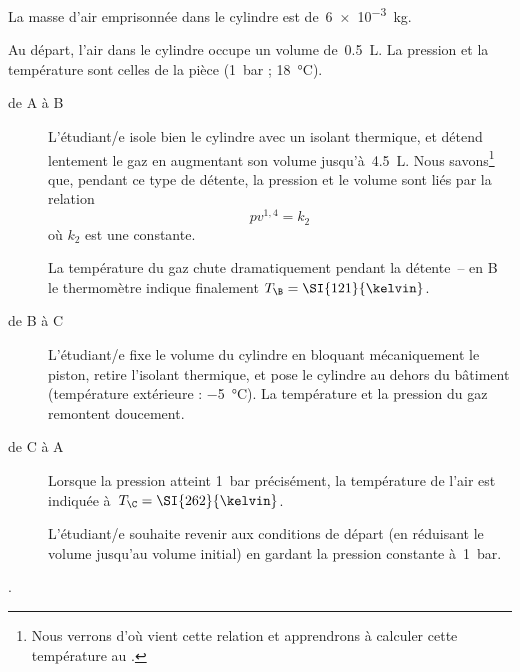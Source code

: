 	La masse d’air emprisonnée dans le cylindre est de~\SI{6e-3}{\kilogram}.
	
	Au départ, l’air dans le cylindre occupe un volume de~\SI{0,5}{\liter}. La pression et la température sont celles de la pièce (\SI{1}{bar} ; \SI{18}{\degreeCelsius}).

	\begin{description}
		\item[de A à B] L’étudiant/e isole bien le cylindre avec un isolant thermique, et détend lentement le gaz en augmentant son volume jusqu’à~\SI{4,5}{\liter}. Nous savons\footnote{Nous verrons d’où vient cette relation et apprendrons à calculer cette température au \coursquatre.} que, pendant ce type de détente, la pression et le volume sont liés par la relation
			\begin{equation*}
				p v^{1,4} = k_2
			\end{equation*}
			 où $k_2$ est une constante.
		
			La température du gaz chute dramatiquement pendant la détente\ – en B le thermomètre indique finalement $T_\B = \SI{121}{\kelvin}$.
		
		\item[de B à C]	L’étudiant/e fixe le volume du cylindre en bloquant mécaniquement le piston, retire l’isolant thermique, et pose le cylindre au dehors du bâtiment (température extérieure : \SI{-5}{\degreeCelsius}). La température et la pression du gaz remontent doucement.

		\item[de C à A] Lorsque la pression atteint \SI{1}{\bar} précisément, la température de l’air est indiquée à~$T_\C = \SI{262}{\kelvin}$. 	
					
			L’étudiant/e souhaite revenir aux conditions de départ (en réduisant le volume jusqu’au volume initial) en gardant la pression constante à~\SI{1}{\bar}.
	\end{description}.
	
